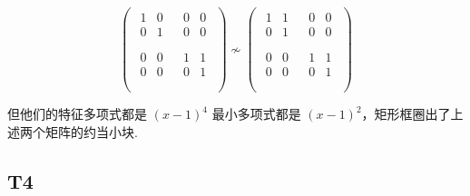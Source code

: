 \documentclass{article}
\begin{document}
\begin{equation*}
	\begin{pmatrix}
		\begin{matrix}
			\boxed{1} & 0\\
			0 & \boxed{1}\\
		\end{matrix} &
		\begin{matrix}
			0 & 0\\
			0 & 0\\
		\end{matrix}\\
		\begin{matrix}
			0 & 0\\
			0 & 0\\
		\end{matrix} &
		\boxed{\begin{matrix}
				1 & 1\\
				0 & 1\\
		\end{matrix}}\\
	\end{pmatrix} \nsim
	\begin{pmatrix}
		\boxed{\begin{matrix}
				1 & 1\\
				0 & 1\\
		\end{matrix}}&
		\begin{matrix}
			0 & 0\\
			0 & 0\\
		\end{matrix}\\
		\begin{matrix}
			0 & 0\\
			0 & 0\\
		\end{matrix}&
		\boxed{\begin{matrix}
			1 & 1\\
			0 & 1\\
		\end{matrix}}\\
	\end{pmatrix}
\end{equation*}

但他们的特征多项式都是 $(x-1)^4$ 最小多项式都是 $(x-1)^2$，矩形框圈出了上述两个矩阵的约当小块.

\subsection{T4}
\end{document}
